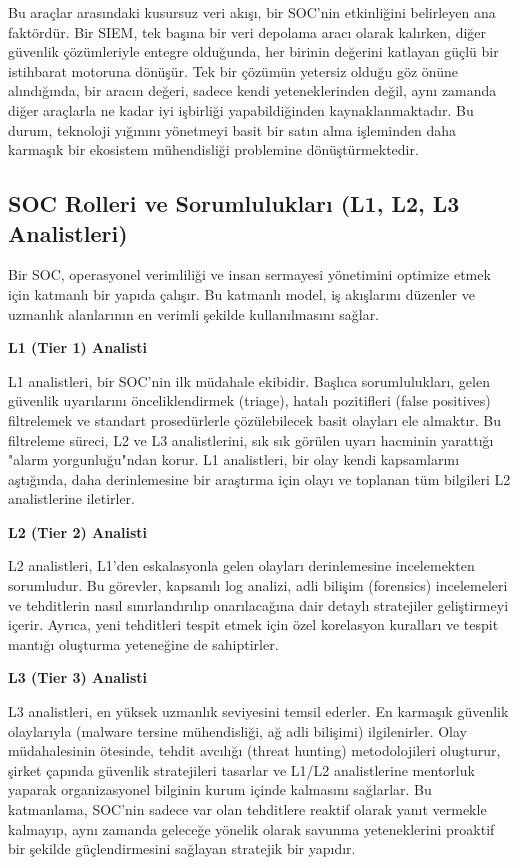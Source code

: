 Bu araçlar arasındaki kusursuz veri akışı, bir SOC'nin etkinliğini belirleyen ana faktördür. Bir SIEM, tek başına bir veri depolama aracı olarak kalırken, diğer güvenlik çözümleriyle entegre olduğunda, her birinin değerini katlayan güçlü bir istihbarat motoruna dönüşür. Tek bir çözümün yetersiz olduğu göz önüne alındığında, bir aracın değeri, sadece kendi yeteneklerinden değil, aynı zamanda diğer araçlarla ne kadar iyi işbirliği yapabildiğinden kaynaklanmaktadır. Bu durum, teknoloji yığınını yönetmeyi basit bir satın alma işleminden daha karmaşık bir ekosistem mühendisliği problemine dönüştürmektedir.

\subsection{SOC Rolleri ve Sorumlulukları (L1, L2, L3 Analistleri)}

Bir SOC, operasyonel verimliliği ve insan sermayesi yönetimini optimize etmek için katmanlı bir yapıda çalışır. Bu katmanlı model, iş akışlarını düzenler ve uzmanlık alanlarının en verimli şekilde kullanılmasını sağlar.

\textbf{L1 (Tier 1) Analisti}

L1 analistleri, bir SOC'nin ilk müdahale ekibidir. Başlıca sorumlulukları, gelen güvenlik uyarılarını önceliklendirmek (triage), hatalı pozitifleri (false positives) filtrelemek ve standart prosedürlerle çözülebilecek basit olayları ele almaktır. Bu filtreleme süreci, L2 ve L3 analistlerini, sık sık görülen uyarı hacminin yarattığı "alarm yorgunluğu"ndan korur. L1 analistleri, bir olay kendi kapsamlarını aştığında, daha derinlemesine bir araştırma için olayı ve toplanan tüm bilgileri L2 analistlerine iletirler.

\textbf{L2 (Tier 2) Analisti}

L2 analistleri, L1'den eskalasyonla gelen olayları derinlemesine incelemekten sorumludur. Bu görevler, kapsamlı log analizi, adli bilişim (forensics) incelemeleri ve tehditlerin nasıl sınırlandırılıp onarılacağına dair detaylı stratejiler geliştirmeyi içerir. Ayrıca, yeni tehditleri tespit etmek için özel korelasyon kuralları ve tespit mantığı oluşturma yeteneğine de sahiptirler.

\textbf{L3 (Tier 3) Analisti}

L3 analistleri, en yüksek uzmanlık seviyesini temsil ederler. En karmaşık güvenlik olaylarıyla (malware tersine mühendisliği, ağ adli bilişimi) ilgilenirler. Olay müdahalesinin ötesinde, tehdit avcılığı (threat hunting) metodolojileri oluşturur, şirket çapında güvenlik stratejileri tasarlar ve L1/L2 analistlerine mentorluk yaparak organizasyonel bilginin kurum içinde kalmasını sağlarlar. Bu katmanlama, SOC'nin sadece var olan tehditlere reaktif olarak yanıt vermekle kalmayıp, aynı zamanda geleceğe yönelik olarak savunma yeteneklerini proaktif bir şekilde güçlendirmesini sağlayan stratejik bir yapıdır.

